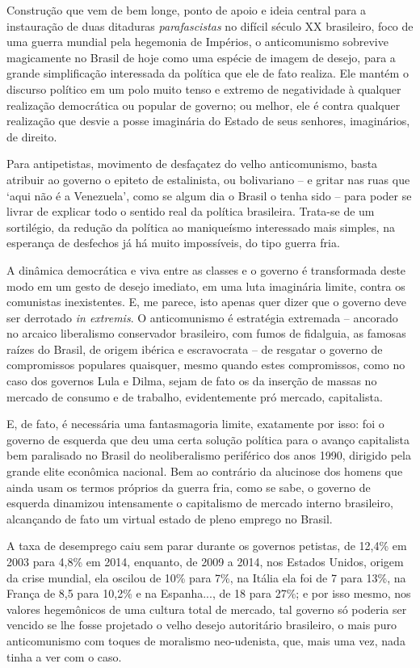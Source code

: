 Construção que vem de bem longe, ponto de apoio e ideia central para a
instauração de duas ditaduras \emph{parafascistas} no difícil século XX
brasileiro, foco de uma guerra mundial pela hegemonia de Impérios, o
anticomunismo sobrevive magicamente no Brasil de hoje como uma espécie
de imagem de desejo, para a grande simplificação interessada da política
que ele de fato realiza. Ele mantém o discurso político em um polo muito
tenso e extremo de negatividade à qualquer realização democrática ou
popular de governo; ou melhor, ele é contra qualquer realização que
desvie a posse imaginária do Estado de seus senhores, imaginários, de
direito.

Para antipetistas, movimento de desfaçatez do velho anticomunismo, basta
atribuir ao governo o epiteto de estalinista, ou bolivariano -- e gritar
nas ruas que `aqui não é a Venezuela', como se algum dia o Brasil o
tenha sido -- para poder se livrar de explicar todo o sentido real da
política brasileira. Trata-se de um sortilégio, da redução da política
ao maniqueísmo interessado mais simples, na esperança de desfechos já há
muito impossíveis, do tipo guerra fria.

A dinâmica democrática e viva entre as classes e o governo é
transformada deste modo em um gesto de desejo imediato, em uma luta
imaginária limite, contra os comunistas inexistentes. E, me parece, isto
apenas quer dizer que o governo deve ser derrotado \emph{in extremis}. O
anticomunismo é estratégia extremada -- ancorado no arcaico liberalismo
conservador brasileiro, com fumos de fidalguia, as famosas raízes do
Brasil, de origem ibérica e escravocrata -- de resgatar o governo de
compromissos populares quaisquer, mesmo quando estes compromissos, como
no caso dos governos Lula e Dilma, sejam de fato os da inserção de
massas no mercado de consumo e de trabalho, evidentemente pró mercado,
capitalista.

E, de fato, é necessária uma fantasmagoria limite, exatamente por isso:
foi o governo de esquerda que deu uma certa solução política para o
avanço capitalista bem paralisado no Brasil do neoliberalismo periférico
dos anos 1990, dirigido pela grande elite econômica nacional. Bem ao
contrário da alucinose dos homens que ainda usam os termos próprios da
guerra fria, como se sabe, o governo de esquerda dinamizou intensamente
o capitalismo de mercado interno brasileiro, alcançando de fato um
virtual estado de pleno emprego no Brasil.

A taxa de desemprego caiu sem parar durante os governos petistas, de
12,4\% em 2003 para 4,8\% em 2014, enquanto, de 2009 a 2014, nos Estados
Unidos, origem da crise mundial, ela oscilou de 10\% para 7\%, na Itália
ela foi de 7 para 13\%, na França de 8,5 para 10,2\% e na Espanha..., de
18 para 27\%; e por isso mesmo, nos valores hegemônicos de uma cultura
total de mercado, tal governo só poderia ser vencido se lhe fosse
projetado o velho desejo autoritário brasileiro, o mais puro
anticomunismo com toques de moralismo neo-udenista, que, mais uma vez,
nada tinha a ver com o caso.

